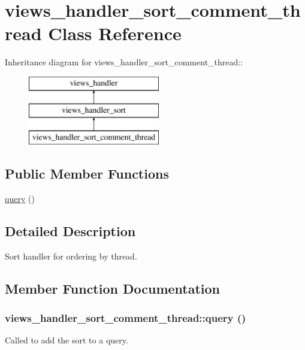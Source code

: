 \hypertarget{classviews__handler__sort__comment__thread}{
\section{views\_\-handler\_\-sort\_\-comment\_\-thread Class Reference}
\label{classviews__handler__sort__comment__thread}
}
Inheritance diagram for views\_\-handler\_\-sort\_\-comment\_\-thread::\begin{figure}[H]
\begin{center}
\leavevmode
\includegraphics[height=3cm]{classviews__handler__sort__comment__thread}
\end{center}
\end{figure}
\subsection*{Public Member Functions}
\begin{DoxyCompactItemize}
\item 
\hyperlink{classviews__handler__sort__comment__thread_a6ea2c9fdba530fd022c1eafd5b0c4cea}{query} ()
\end{DoxyCompactItemize}


\subsection{Detailed Description}
Sort handler for ordering by thread. 

\subsection{Member Function Documentation}
\hypertarget{classviews__handler__sort__comment__thread_a6ea2c9fdba530fd022c1eafd5b0c4cea}{
\subsubsection[{query}]{\setlength{\rightskip}{0pt plus 5cm}views\_\-handler\_\-sort\_\-comment\_\-thread::query ()}}
\label{classviews__handler__sort__comment__thread_a6ea2c9fdba530fd022c1eafd5b0c4cea}
Called to add the sort to a query. 

